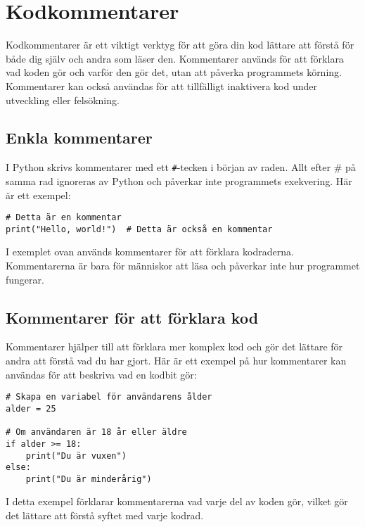 
\section{Kodkommentarer}
\label{section:comments}
Kodkommentarer är ett viktigt verktyg för att göra din kod lättare att förstå för både dig själv och andra som läser den. Kommentarer används för att förklara vad koden gör och varför den gör det, utan att påverka programmets körning. Kommentarer kan också användas för att tillfälligt inaktivera kod under utveckling eller felsökning.

\subsection{Enkla kommentarer}
I Python skrivs kommentarer med ett \texttt{\#}-tecken i början av raden. Allt efter \# på samma rad ignoreras av Python och påverkar inte programmets exekvering. Här är ett exempel:

\begin{lstlisting}[title=Exempel på en enkel kommentar]
# Detta är en kommentar
print("Hello, world!")  # Detta är också en kommentar
\end{lstlisting}

I exemplet ovan används kommentarer för att förklara kodraderna. Kommentarerna är bara för människor att läsa och påverkar inte hur programmet fungerar.


\subsection{Kommentarer för att förklara kod}
Kommentarer hjälper till att förklara mer komplex kod och gör det lättare för andra att förstå vad du har gjort. Här är ett exempel på hur kommentarer kan användas för att beskriva vad en kodbit gör:

\begin{lstlisting}[title=Kommentarer för att förklara kod]
# Skapa en variabel för användarens ålder
alder = 25

# Om användaren är 18 år eller äldre
if alder >= 18:
    print("Du är vuxen")
else:
    print("Du är minderårig")
\end{lstlisting}

I detta exempel förklarar kommentarerna vad varje del av koden gör, vilket gör det lättare att förstå syftet med varje kodrad.

